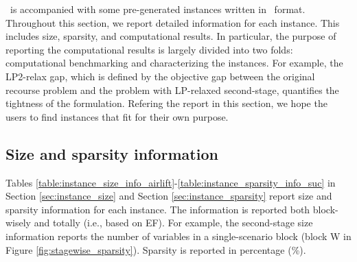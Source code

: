 %
%

\siplibtwo\ is accompanied with some pre-generated instances written in \smps\ format. Throughout this section, we report detailed information for each instance. This includes size, sparsity, and computational results. In particular, the purpose of reporting the computational results is largely divided into two folds: computational benchmarking and characterizing the instances. For example, the LP2-relax gap, which is defined by the objective gap between the original recourse problem and the problem with LP-relaxed second-stage, quantifies the tightness of the formulation. Refering the report in this section, we hope the users to find instances that fit for their own purpose.


\subsection{Size and sparsity information}
Tables \ref{table:instance_size_info_airlift}-\ref{table:instance_sparsity_info_suc} in Section \ref{sec:instance_size} and Section \ref{sec:instance_sparsity} report size and sparsity information for each instance. The information is reported both block-wisely and totally (i.e., based on EF). For example, the second-stage size information reports the number of variables in a single-scenario block (block W in Figure \ref{fig:stagewise_sparsity}). Sparsity is reported in percentage (\%). 

